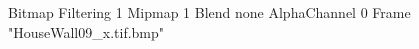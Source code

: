 {Bitmap
	{Filtering 1}
	{Mipmap 1}
	{Blend none}
	{AlphaChannel 0}
	{Frame "HouseWall09_x.tif.bmp"}
}
